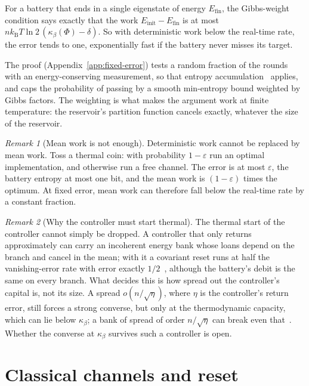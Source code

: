 \documentclass[11pt]{article}
\theoremstyle{definition}
\theoremstyle{remark}
\newtheorem{remark}{Remark}
\newcommand{\kB}{k_{\mathrm B}}
\newcommand{\Trt}{\kappa_\beta}
\begin{document}
For a battery that ends in a single eigenstate of energy $E_{\mathrm{fin}}$, the Gibbs-weight condition says exactly that the work $E_{\mathrm{init}}-E_{\mathrm{fin}}$ is at most $n\kB T\ln2\,(\Trt(\Phi)-\delta)$. So with deterministic work below the real-time rate, the error tends to one, exponentially fast if the battery never misses its target.

The proof (Appendix~\ref{app:fixed-error}) tests a random fraction of the rounds with an energy-conserving measurement, so that entropy accumulation~\cite{DFR20} applies, and caps the probability of passing by a smooth min-entropy bound weighted by Gibbs factors. The weighting is what makes the argument work at finite temperature: the reservoir's partition function cancels exactly, whatever the size of the reservoir.

\begin{remark}[Mean work is not enough]
Deterministic work cannot be replaced by mean work. Toss a thermal coin: with probability $1-\varepsilon$ run an optimal implementation, and otherwise run a free channel. The error is at most $\varepsilon$, the battery entropy at most one bit, and the mean work is $(1-\varepsilon)$ times the optimum. At fixed error, mean work can therefore fall below the real-time rate by a constant fraction.
\end{remark}

\begin{remark}[Why the controller must start thermal]\label{rem:thermal-controller}
The thermal start of the controller cannot simply be dropped. A controller that only returns approximately can carry an incoherent energy bank whose loans depend on the branch and cancel in the mean; with it a covariant reset runs at half the vanishing-error rate with error exactly $1/2$~\cite{KeepingTime}, although the battery's debit is the same on every branch. What decides this is how spread out the controller's capital is, not its size. A spread $o(n/\sqrt\eta)$, where $\eta$ is the controller's return error, still forces a strong converse, but only at the thermodynamic capacity, which can lie below $\Trt$; a bank of spread of order $n/\sqrt\eta$ can break even that~\cite{KeepingTime}. Whether the converse at $\Trt$ survives such a controller is open.
\end{remark}

\section{Classical channels and reset}\label{sec:classical}
\end{document}
